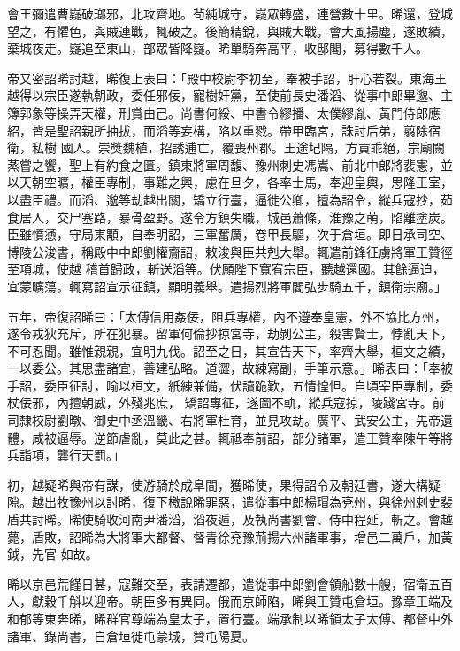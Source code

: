 \begin{pinyinscope}
 會王彌遣曹嶷破瑯邪，北攻齊地。茍純城守，嶷眾轉盛，連營數十里。晞還，登城望之，有懼色，與賊連戰，輒破之。後簡精銳，與賊大戰，會大風揚塵，遂敗績，棄城夜走。嶷追至東山，部眾皆降嶷。晞單騎奔高平，收邸閣，募得數千人。



 帝又密詔晞討越，晞復上表曰：「殿中校尉李初至，奉被手詔，肝心若裂。東海王越得以宗臣遂執朝政，委任邪佞，寵樹奸黨，至使前長史潘滔、從事中郎畢邈、主簿郭象等操弄天權，刑賞由己。尚書何綏、中書令繆播、太僕繆胤、黃門侍郎應紹，皆是聖詔親所抽拔，而滔等妄構，陷以重戮。帶甲臨宮，誅討后弟，翦除宿衛，私樹
 國人。崇獎魏植，招誘逋亡，覆喪州郡。王途圮隔，方貢乖絕，宗廟闕蒸嘗之饗，聖上有約食之匱。鎮東將軍周馥、豫州刺史馮嵩、前北中郎將裴憲，並以天朝空曠，權臣專制，事難之興，慮在旦夕，各率士馬，奉迎皇輿，思隆王室，以盡臣禮。而滔、邈等劫越出關，矯立行臺，逼徙公卿，擅為詔令，縱兵寇抄，茹食居人，交尸塞路，暴骨盈野。遂令方鎮失職，城邑蕭條，淮豫之萌，陷離塗炭。臣雖憤懣，守局東顒，自奉明詔，三軍奮厲，卷甲長驅，次于倉垣。即日承司空、博陵公浚書，稱殿中中郎劉權齎詔，敕浚與臣共剋大舉。輒遣前鋒征虜將軍王贊徑至項城，使越
 稽首歸政，斬送滔等。伏願陛下寬宥宗臣，聽越還國。其餘逼迫，宜蒙曠蕩。輒寫詔宣示征鎮，顯明義舉。遣揚烈將軍閻弘步騎五千，鎮衛宗廟。」



 五年，帝復詔晞曰：「太傅信用姦佞，阻兵專權，內不遵奉皇憲，外不協比方州，遂令戎狄充斥，所在犯暴。留軍何倫抄掠宮寺，劫剝公主，殺害賢士，悖亂天下，不可忍聞。雖惟親親，宜明九伐。詔至之日，其宣告天下，率齊大舉，桓文之績，一以委公。其思盡諸宜，善建弘略。道澀，故練寫副，手筆示意。」晞表曰：「奉被手詔，委臣征討，喻以桓文，紙練兼備，伏讀跪歎，五情惶怛。自頃宰臣專制，委杖佞邪，內擅朝威，外殘兆庶，
 矯詔專征，遂圖不軌，縱兵寇掠，陵踐宮寺。前司隸校尉劉暾、御史中丞溫畿、右將軍杜育，並見攻劫。廣平、武安公主，先帝遺體，咸被逼辱。逆節虐亂，莫此之甚。輒祗奉前詔，部分諸軍，遣王贊率陳午等將兵詣項，龔行天罰。」



 初，越疑晞與帝有謀，使游騎於成阜間，獲晞使，果得詔令及朝廷書，遂大構疑隙。越出牧豫州以討晞，復下檄說晞罪惡，遣從事中郎楊瑁為兗州，與徐州刺史裴盾共討晞。晞使騎收河南尹潘滔，滔夜遁，及執尚書劉會、侍中程延，斬之。會越薨，盾敗，詔晞為大將軍大都督、督青徐兗豫荊揚六州諸軍事，增邑二萬戶，加黃鉞，先官
 如故。



 晞以京邑荒饉日甚，寇難交至，表請遷都，遣從事中郎劉會領船數十艘，宿衛五百人，獻穀千斛以迎帝。朝臣多有異同。俄而京師陷，晞與王贊屯倉垣。豫章王端及和郁等東奔晞，晞群官尊端為皇太子，置行臺。端承制以晞領太子太傅、都督中外諸軍、錄尚書，自倉垣徙屯蒙城，贊屯陽夏。




\end{pinyinscope}
